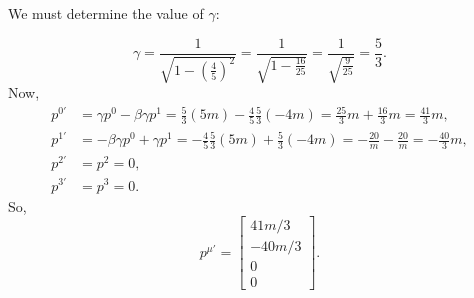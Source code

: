\begin{parts}
        We must determine the value of $\gamma$:

            \begin{equation}
                \gamma = \frac{1}{\sqrt{1-\left(\frac{4}{5}\right)^2}} = \frac{1}{\sqrt{1-\frac{16}{25}}} = \frac{1}{\sqrt{\frac{9}{25}}} = \frac{5}{3}.
            \end{equation}
        Now,
            \begin{align}
                p^{0\prime} &= \gamma p^0 - \beta\gamma p^1 = \frac{5}{3}(5m) - \frac{4}{5}\frac{5}{3}(-4m) = \frac{25}{3}m + \frac{16}{3}m = \frac{41}{3}m, \\
                p^{1\prime} &= -\beta\gamma p^0  + \gamma p^1 = -\frac{4}{5}\frac{5}{3}(5m) + \frac{5}{3}(-4m) = -\frac{20}{m} - \frac{20}{m} = -\frac{40}{3}m, \\
                p^{2\prime} &= p^2 = 0, \\
                p^{3\prime} &= p^3 = 0.
            \end{align}
        So,
            \begin{equation}
                \boxed{p^{\mu\prime} = \begin{bmatrix} 41m/3 \\ -40m/3 \\ 0 \\ 0 \end{bmatrix}}.
            \end{equation}
    \end{parts}